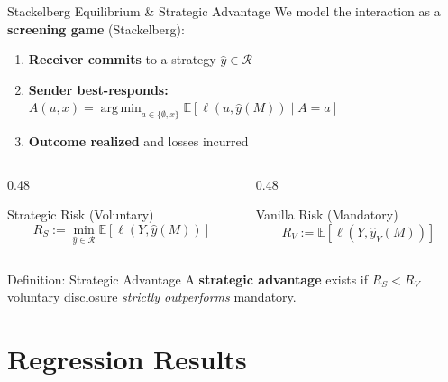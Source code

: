 \documentclass[aspectratio=169, 10pt]{beamer}
\newcommand{\E}{\mathbb{E}}
\DeclareMathOperator*{\argmin}{arg\,min}
\newcommand{\cR}{\mathcal{R}}
\begin{document}
\begin{frame}{Stackelberg Equilibrium \& Strategic Advantage}
  We model the interaction as a \textbf{screening game} (Stackelberg):
  \vspace{4pt}
  \begin{enumerate}
    \item \textcolor{primaryTeal}{\textbf{Receiver commits}} to a strategy $\hat{y} \in \cR$
    \item \textcolor{accentCoral}{\textbf{Sender best-responds:}} $\displaystyle A(u,x) = \argmin_{a \in \{\emptyset, x\}} \E[\ell(u, \hat{y}(M)) \mid A = a]$
    \item \textcolor{primaryDark}{\textbf{Outcome realized}} and losses incurred
  \end{enumerate}
  \vspace{8pt}
  \begin{columns}[T]
    \begin{column}{0.48\textwidth}
      \begin{alertblock}{Strategic Risk (Voluntary)}
        \vspace{-6pt}
        $$R_S := \min_{\hat{y} \in \cR} \E[\ell(Y, \hat{y}(M))]$$
        \vspace{-10pt}
      \end{alertblock}
    \end{column}
    \begin{column}{0.48\textwidth}
      \begin{block}{Vanilla Risk (Mandatory)}
        \vspace{-6pt}
        $$R_V := \E[\ell(Y, \hat{y}_V(M))]$$
        \vspace{-10pt}
      \end{block}
    \end{column}
  \end{columns}
  \vspace{8pt}
  \begin{exampleblock}{Definition: Strategic Advantage}
    \centering A \textbf{strategic advantage} exists if $R_S < R_V$\quad\textemdash\quad voluntary disclosure \textit{strictly outperforms} mandatory.
  \end{exampleblock}
\end{frame}

\section{Regression Results}
\end{document}
